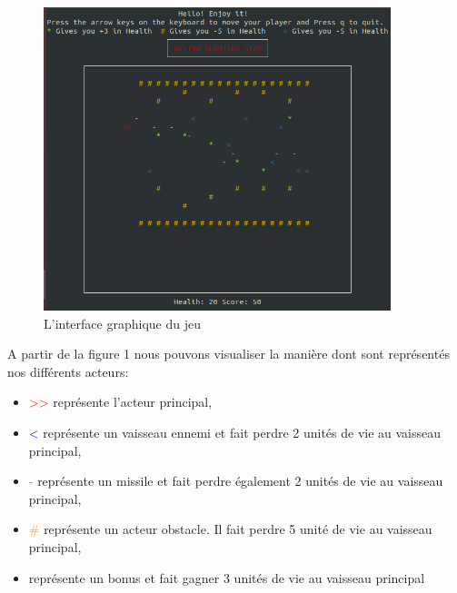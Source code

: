 \begin{figure}[h]
    \centering
    \label{fig:actor}
    \includegraphics[width=0.9\textwidth]{Images/actor.png}
    \caption{L'interface graphique du jeu}
\end{figure}

A partir de la figure 1 nous pouvons visualiser la manière dont sont représentés nos différents acteurs:
\\

\begin{itemize}
    \item \textcolor{red}{\huge >>} représente l'acteur principal,
    \item \textcolor{blue}{\large <} représente un vaisseau ennemi et fait perdre 2 unités de vie au vaisseau principal,
    \item \textcolor{gray}{\huge -} représente un missile et fait perdre également 2 unités de vie au vaisseau principal,
    \item \textcolor{orange}{\#} représente un acteur obstacle. Il fait perdre 5 unité de vie au vaisseau principal,
    \item \textcolor{green}{\large *} représente un bonus et fait gagner 3 unités de vie au vaisseau principal
\end{itemize}



